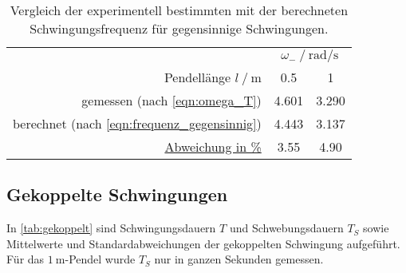 \begin{table}
    \centering
    \caption{Vergleich der experimentell bestimmten mit der berechneten Schwingungsfrequenz für gegensinnige Schwingungen.}
    \label{tab:omega_gegensinnig}
    \begin{tabular}{r S S}
        \toprule
        &  \\
        \cmidrule(lr){2-3}
        Pendellänge $l \mathbin{/} \si{\meter}$ &
        0.5 &
        1 \\
        \midrule
        gemessen (nach \autoref{eqn:omega_T}) & 4.601 & 3.290 \\
        berechnet (nach \autoref{eqn:frequenz_gegensinnig}) & 4.443 & 3.137 \\
        \midrule
        \hyperref[eqn:abweichung_prozent]{Abweichung in \%} & 3.55 & 4.90 \\
        \bottomrule
    \end{tabular}
\end{table}


\subsection{Gekoppelte Schwingungen}
\label{sec:auswertung:gekoppelt}

In \autoref{tab:gekoppelt} sind Schwingungsdauern $T$ und Schwebungsdauern $T_S$ sowie Mittelwerte und Standardabweichungen der gekoppelten Schwingung aufgeführt.
Für das $\SI{1}{\meter}$-Pendel wurde $T_S$ nur in ganzen Sekunden gemessen.

